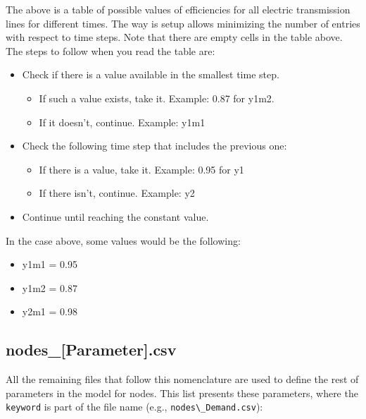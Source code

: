 \documentclass{article}
\begin{document}
The above is a table of possible values of efficiencies for all electric transmission lines for different times. The way is setup allows minimizing the number of entries with respect to time steps. Note that there are empty cells in the table above. The steps to follow when you read the table are:
\begin{itemize}
  \item Check if there is a value available in the smallest time step.
  \begin{itemize}
    \item If such a value exists, take it. Example: 0.87 for y1m2.
    \item If it doesn't, continue. Example: y1m1
  \end{itemize}
  \item Check the following time step that includes the previous one:
  \begin{itemize}
    \item If there is a value, take it. Example: 0.95 for y1
    \item If there isn't, continue. Example: y2
  \end{itemize}
  \item Continue until reaching the constant value.
\end{itemize}

In the case above, some values would be the following:
\begin{itemize}
  \item y1m1 = 0.95
  \item y1m2 = 0.87
  \item y2m1 = 0.98
\end{itemize}


\subsection{nodes\_[Parameter].csv}

All the remaining files that follow this nomenclature are used to define the rest of parameters in the model for nodes. This list presents these parameters, where the \verb=keyword= is part of the file name (e.g., \verb=nodes\_Demand.csv=):
\end{document}

